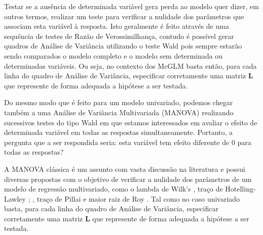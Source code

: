 Testar se a ausência de determinada variável gera perda ao modelo quer dizer, em outros termos, realizar um teste para verificar a nulidade dos parâmetros que associam esta variável à resposta. Isto geralmente é feito através de uma sequência de testes de Razão de Verossimilhança, contudo  é possível gerar quadros de Análise de Variância utilizando o teste Wald pois sempre estarão sendo comparados o modelo completo e o modelo sem determinada ou determinadas variáveis. Ou seja, no contexto dos McGLM basta então, para cada linha do quadro de Análise de Variância, especificar corretamente uma matriz $\boldsymbol{L}$ que represente de forma adequada a hipótese a ser testada.

Do mesmo modo que é feito para um modelo univariado, podemos chegar também a uma Análise de Variância Multivariada (MANOVA) realizando sucessivos testes do tipo Wald em que estamos interessados em avaliar o efeito de determinada variável em todas as respostas simultaneamente. Portanto, a pergunta que a ser respondida seria: esta variável tem efeito diferente de 0 para todas as respostas?

A MANOVA clássica \citep{manova} é um assunto com vasta discussão na literatura e possui diversas propostas com o objetivo de verificar a nulidade dos parâmetros de um modelo de regressão multivariado, como o lambda de Wilk's \citep{wilks}, traço de Hotelling-Lawley \citep{lawley}; \citep{hotelling}, traço de Pillai \citep{pillai} e maior raiz de Roy \citep{roy}. Tal como no caso univariado basta, para cada linha do quadro de Análise de Variância, especificar corretamente uma matriz $\boldsymbol{L}$ que represente de forma adequada a hipótese a ser testada.

